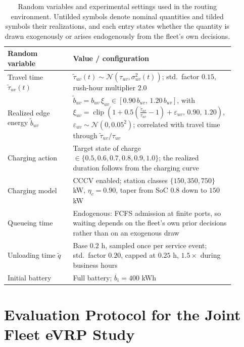 \documentclass[journal]{IEEEtran}
\begin{document}
\begin{table}[t]
\centering
\caption{Random variables and experimental settings used in the routing environment. Untilded symbols denote nominal quantities and tilded symbols their realizations, and each entry states whether the quantity is drawn exogenously or arises endogenously from the fleet's own decisions.}
\label{tab:random_variables}
\small
\begin{tabular}{p{0.29\linewidth} p{0.60\linewidth}}
\toprule
\textbf{Random variable} & \textbf{Value / configuration} \\
\midrule
Travel time $\tilde{\tau}_{uv}(t)$
& $\tilde{\tau}_{uv}(t)\sim 
\mathcal{N}\!\left(\tau_{uv},\sigma_{uv}^{2}(t)\right)$; 
std.\ factor $0.15$, rush-hour multiplier $2.0$ \\

Realized edge energy $\tilde{b}_{uv}$
&
$\tilde{b}_{uv}=b_{uv}\,\xi_{uv}\in[0.90\,b_{uv},\,1.20\,b_{uv}]$, with
$\xi_{uv}=\operatorname{clip}\!\left(
1+0.5\!\left(\frac{\tilde{\tau}_{uv}}{\tau_{uv}}-1\right)
+\varepsilon_{uv},\,0.90,\,1.20
\right)$, $\varepsilon_{uv}\sim\mathcal{N}\!\left(0,0.05^{2}\right)$;
correlated with travel time through $\tilde{\tau}_{uv}/\tau_{uv}$ \\

Charging action
& Target state of charge $\in\{0.5,0.6,0.7,0.8,0.9,1.0\}$; the realized
duration follows from the charging curve \\

Charging model
& CCCV enabled; station classes $\{150,350,750\}$ kW, $\eta_c=0.90$,
taper from SoC $0.8$ down to $150$ kW \\

Queueing time
& Endogenous: FCFS admission at finite ports, so waiting depends on the
fleet's own prior decisions rather than on an exogenous draw \\

Unloading time $\tilde{q}$
& Base $0.2$ h, sampled once per service event; std.\ factor $0.20$,
capped at $0.25$ h, $1.5\times$ during business hours \\

Initial battery
& Full battery; $\overline{b}_i=400$ kWh \\
\bottomrule
\end{tabular}
\end{table}

\section{Evaluation Protocol for the Joint Fleet eVRP Study}
\end{document}
